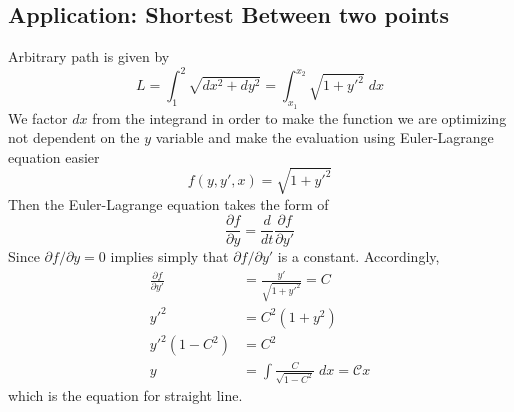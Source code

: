 \documentclass[../main.tex]{subfiles}
\begin{document}
\subsection*{Application: Shortest Between two points}
Arbitrary path is given by 
\begin{equation*}
    L=\int_{1}^{2}\sqrt{dx^2+dy^2}=\int_{x_1}^{x_2}\sqrt{1+y'^2}\;dx
\end{equation*}
We factor $dx$ from the integrand in order to make the function we are optimizing not dependent on the $y$ variable and make the evaluation using Euler-Lagrange equation easier
\begin{equation*}
    f(y,y',x)=\sqrt{1+y'^2}
\end{equation*}
Then the Euler-Lagrange equation takes the form of 
\begin{equation*}
    \frac{\partial f}{\partial y}=\frac{d}{dt}\frac{\partial f}{\partial y'}
\end{equation*}
Since $\partial f/\partial y=0$ implies simply that $\partial f/\partial y'$ is a constant. Accordingly, 
\begin{align*}
    \frac{\partial f}{\partial y'}&=\frac{y'}{\sqrt{1+y'^2}}=C\\
    y'^2&=C^2(1+y^2)\\
    y'^2(1-C^2)&=C^2\\
    y&=\int\frac{C}{\sqrt{1-C^2}}\;dx=\mathcal{C}x
\end{align*}
which is the equation for straight line.
\end{document}
